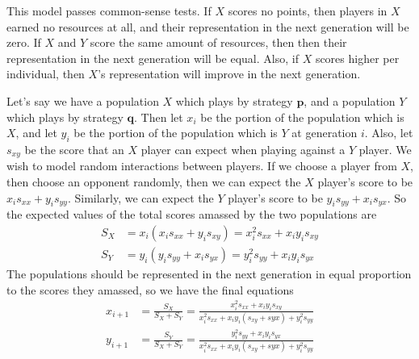 \documentclass{article}
\renewcommand{\vec}[1]{\mathbf{#1}}
\begin{document}
This model passes common-sense tests. If \(X\) scores no points, then players in \(X\) earned no resources at all, and their representation in the next generation will be zero. If \(X\) and \(Y\) score the same amount of resources, then then their representation in the next generation will be equal. Also, if \(X\) scores higher per individual, then \(X\)'s representation will improve in the next generation.

Let's say we have a population \(X\) which plays by strategy \(\vec{p}\), and a population \(Y\) which plays by strategy \(\vec{q}\). Then let \(x_i\) be the portion of the population which is \(X\), and let \(y_i\) be the portion of the population which is \(Y\) at generation \(i\). Also, let \(s_{xy}\) be the score that an \(X\) player can expect when playing against a \(Y\) player. We wish to model random interactions between players. If we choose a player from \(X\), then choose an opponent randomly, then we can expect the \(X\) player's score to be \( x_i s_{xx} + y_i s_{yy}\). Similarly, we can expect the \(Y\) player's score to be \(y_i s_{yy} + x_i s_{yx}\). So the expected values of the total scores amassed by the two populations are
\begin{equation}
\begin{aligned}
S_X &= x_i (x_i s_{xx} + y_i s_{xy}) = x_i^2 s_{xx} + x_i y_i s_{xy}\\
S_Y &= y_i (y_i s_{yy} + x_i s_{yx}) = y_i^2 s_{yy} + x_i y_i s_{yx}
\end{aligned}\label{eq:2_player_population_scores}
\end{equation}
The populations should be represented in the next generation in equal proportion to the scores they amassed, so we have the final equations
\begin{equation}
\begin{aligned}
x_{i + 1} &= \frac{S_X}{S_X + S_Y} = \frac{x_i^2 s_{xx} + x_i y_i s_{xy}}{x_i^2 s_{xx} + x_i y_i(s_{xy} + s{yx}) + y_i^2 s_{yy}} \\
y_{i + 1} &= \frac{S_Y}{S_X + S_Y} = \frac{y_i^2 s_{yy} + x_i y_i s_{yx}}{x_i^2 s_{xx} + x_i y_i(s_{xy} + s{yx}) + y_i^2 s_{yy}}
\end{aligned}\label{eq:2_player_populations}
\end{equation}
\end{document}
